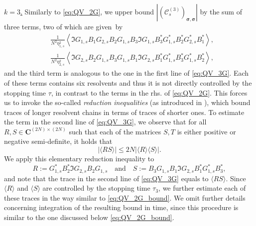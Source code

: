 \documentclass[10pt]{amsart}
\numberwithin{equation}{section}
\newcommand{\C}{\mathbf{C}}
\begin{document}
\noindent\underline{$k=3$.} Similarly to \eqref{eq:QV_2G}, we upper bound $|(\mathcal{C}^{(3)}_s)_{\bm{\sigma},\bm{\sigma}}|$ by the sum of three terms, two of which are given~by
\begin{equation}
\begin{split}
&\frac{1}{N^2\eta_{1,s}^2} \left\langle \Im G_{1,s} B_1 G_{2,s} B_2 G_{1,s} B_3 \Im G_{1,s} B_3^* G_{1,s}^* B_2^* G_{2,s}^* B_1^*\right\rangle,\\
&\frac{1}{N^2\eta_{2,s}^2} \left\langle \Im G_{2,s} B_2 G_{1,s} B_3 G_{1,s} B_1\Im G_{2,s} B_1^* G_{1,s}^*B_3^* G_{1,s}^* B_2^*\right\rangle,
\end{split}
\label{eq:QV_3G}
\end{equation}
and the third term is analogous to the one in the first line of \eqref{eq:QV_3G}. Each of these terms contains six resolvents and thus it is not directly controlled by the stopping time $\tau$, in contrast to the terms in the rhs. of \eqref{eq:QV_2G}. This forces us to invoke the so-called \emph{reduction inequalities} (as introduced in \cite{Multi_res_llaws}), which bound traces of longer resolvent chains in terms of traces of shorter ones.
 To estimate the term in the second line of \eqref{eq:QV_3G}, we observe that for all $R,S\in \C^{(2N)\times (2N)}$ such that each of the matrices $S,T$ is either positive or negative semi-definite, it holds that
\begin{equation}
|\langle RS\rangle|\le 2N|\langle R\rangle\langle S\rangle|.
\label{eq:reduction_simple}
\end{equation}
We apply this elementary reduction inequality to
\begin{equation}
R:=G_{1,s}^*B_2^*\Im G_{2,s}B_2G_{1,s}\quad \text{and}\quad S:= B_3G_{1,s}B_1 \Im G_{2,s} B_1^* G_{1,s}^*B_3^*,
\end{equation}
and note that the trace in the second line of \eqref{eq:QV_3G} equals to $\langle RS\rangle$. Since $\langle R\rangle$ and $\langle S\rangle$ are controlled by the stopping time $\tau_3$, we further estimate each of these traces in the way similar to \eqref{eq:QV_2G_bound}. We omit further details concerning integration of the resulting bound in time, since this procedure is similar to the one discussed below \eqref{eq:QV_2G_bound}.
\end{document}
